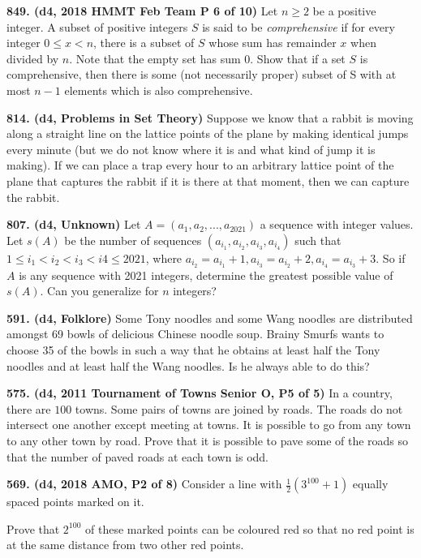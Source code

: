 \documentclass{article}
\begin{document}
        \textbf{849. (\color{red}d4\color{black}, 2018 HMMT Feb Team P 6 of 10)} Let $n \geq 2$ be a positive integer. A subset of positive integers $S$ is said to be \textit{comprehensive} if for every integer $0 \leq x < n$, there is a subset of $S$ whose sum has remainder $x$ when divided by $n$. Note that the empty set has sum $0$. Show that if a set $S$ is comprehensive, then there is some (not necessarily proper) subset of S with at most $n - 1$ elements which is also comprehensive.

        \textbf{814. (\color{red}d4\color{black}, Problems in Set Theory)} Suppose we know that a rabbit is moving along a straight line on the lattice points of the plane by making identical jumps every minute (but we do not know where it is and what kind of jump it is making). If we can place a trap every hour to an arbitrary lattice point of the plane that captures the rabbit if it is there at that moment, then we can capture the rabbit.

        \textbf{807. (\color{red}d4\color{black}, Unknown)} Let $A = (a_1, a_2, . . . , a_{2021})$ a sequence with integer values. Let $s(A)$ be the number of sequences $(a_{i_1}, a_{i_2}, a_{i_3}, a_{i_4})$ such that $1 \leq i_1 < i_2 < i_3 < i4  \leq 2021$, where $a_{i_2} = a_{i_1} + 1, a_{i_3} = a_{i_2} + 2, a_{i_4} = a_{i_3} + 3$. So if $A$ is any sequence with 2021 integers, determine the greatest possible value of $s(A)$. Can you generalize for $n$ integers?

        \textbf{591. (\color{red}d4\color{black}, Folklore)} Some Tony noodles and some Wang noodles are distributed amongst 69 bowls of delicious Chinese noodle soup. Brainy Smurfs wants to choose 35 of the bowls in such a way that he obtains at least half the Tony noodles and at least half the Wang noodles. Is he always able to do this?

        \textbf{575. (\color{red}d4\color{black}, 2011 Tournament of Towns Senior O, P5 of 5)} In a country, there are $100$ towns. Some pairs of towns are joined by roads. The roads do not intersect one another except meeting at towns. It is possible to go from any town to any other town by road. Prove that it is possible to pave some of the roads so that the number of paved roads at each town is odd.

        \textbf{569. (\color{red}d4\color{black}, 2018 AMO, P2 of 8)} Consider a line with $\frac12(3^{100}+1)$ equally spaced points marked on it.

        Prove that $2^{100}$ of these marked points can be coloured red so that no red point is at the same distance from two other red points.
\end{document}

